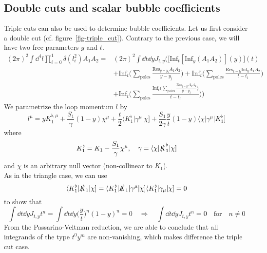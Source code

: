 \subsection*{Double cuts and scalar bubble coefficients}
Triple cuts can also be used to determine bubble coefficients. 
Let us first consider a double cut (cf. figure~\ref{fig-triple_cut}).
Contrary to the previous case, we will have two free parameters $y$ and $t$.
\begin{equation}\label{2-part_cut}
\begin{split}
(2\pi)^2\int \dd^4 l \prod_{i=0}^1 \delta(l_i^2) A_1 A_2 = & 
(2\pi)^2\int \dd t\dd y J_{t,y}\Big(\big[\mathrm{Inf}_t [\mathrm{Inf}_y(A_1A_2)](y)\big](t) 
\\&
+
\mathrm{Inf}_t\big(\sum_{\textrm{poles}}\frac{\mathrm{Res}_{y = y_i}A_1A_2}{y-y_j})
+
\mathrm{Inf}_t\big(\sum_{\textrm{poles}}\frac{\mathrm{Res}_{t = t_l}\mathrm{Inf}_y A_1A_2}{t-t_l})
\\ &
+
\mathrm{Inf}_t\big(\sum_{\textrm{poles}}\frac{\mathrm{Inf}_t\big(\sum_{\textrm{poles}}\frac{\mathrm{Res}_{y = y_i}A_1A_2}{y-y_j}\big)}{t-t_l}\big)
\Big)
\end{split}
\end{equation}
We parametrize the loop momentum $l$ by
\begin{equation}
l^\mu = yK_1^{\flat,\mu} + \frac{S_1}{\gamma}(1-y)\chi^\mu + \frac{t}{2}\langle K_1^\flat|\gamma^\mu|\chi] + \frac{S_1}{2\gamma}\frac{y}{t}(1-y)\langle \chi|\gamma^\mu|K_1^\flat]
\end{equation}
where
\begin{equation}
K_1^\flat = K_1 - \frac{S_1}{\gamma}\chi^\mu ,\quad
\gamma = \langle \chi | \slashed{K}_1^\flat|\chi]
\end{equation}
and $\chi$ is an arbitrary null vector (non-collinear to $K_1$).
\\
As in the triangle case, we can use 
\begin{equation}
\langle K_1^\flat| \slashed{K}_1|\chi] = \langle K_1^\flat|\slashed{K}_1 | \gamma^\mu|\chi]\langle K_1^\flat|\gamma_\mu|\chi]= 0
\end{equation}
to show that
\begin{equation}
\int\dd t\dd y J_{t,y}t^n = \int \dd t \dd y \big(\frac{y}{t}\big)^n(1-y)^n = 0
\quad\Rightarrow\quad
\int \dd t \dd y J_{t,y}t^n = 0
\quad\textrm{for}\quad n\neq 0
\end{equation} 
From the Passarino-Veltman reduction, we are able to conclude that all integrands of the type $t^0y^m$ are non-vanishing, which makes difference \wrt the triple cut case. 
